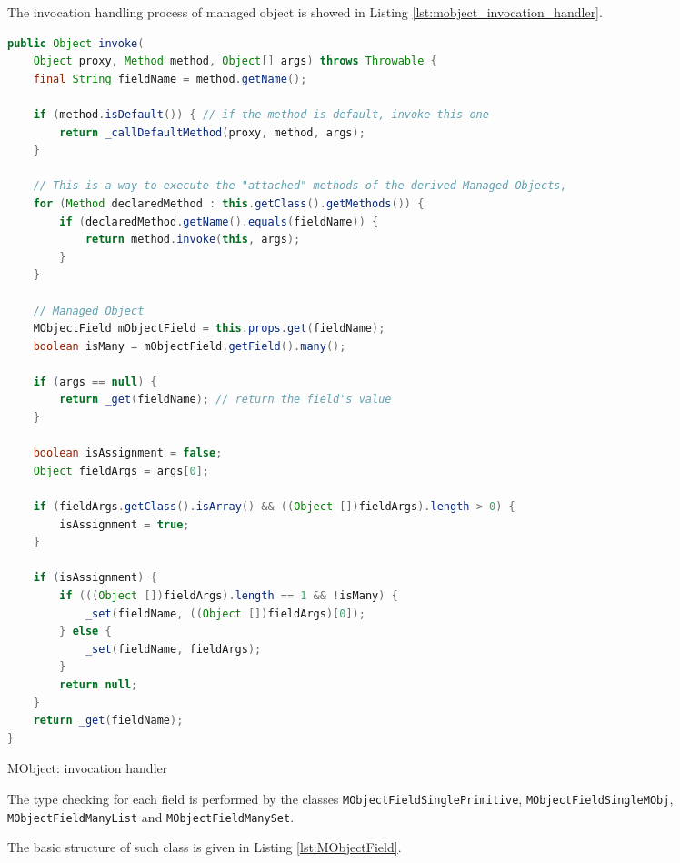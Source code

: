 The invocation handling process of managed object is showed in Listing \ref{lst:mobject_invocation_handler}.

\begin{sourcecode}
	\begin{lstlisting}[language=Java, escapechar=|]
public Object invoke(
	Object proxy, Method method, Object[] args) throws Throwable {
	final String fieldName = method.getName();

	if (method.isDefault()) { // if the method is default, invoke this one
		return _callDefaultMethod(proxy, method, args);
	}

	// This is a way to execute the "attached" methods of the derived Managed Objects,
	for (Method declaredMethod : this.getClass().getMethods()) {
		if (declaredMethod.getName().equals(fieldName)) {
			return method.invoke(this, args);
		}
	}

	// Managed Object
	MObjectField mObjectField = this.props.get(fieldName);
	boolean isMany = mObjectField.getField().many();

	if (args == null) {
		return _get(fieldName); // return the field's value
	}

	boolean isAssignment = false;
	Object fieldArgs = args[0];

	if (fieldArgs.getClass().isArray() && ((Object [])fieldArgs).length > 0) {
		isAssignment = true;
	}

	if (isAssignment) {
		if (((Object [])fieldArgs).length == 1 && !isMany) {
			_set(fieldName, ((Object [])fieldArgs)[0]);
		} else {
			_set(fieldName, fieldArgs);
		}
		return null;
	}
	return _get(fieldName);
}
	\end{lstlisting}
	\caption{MObject: invocation handler}
	\label{lst:mobject_invocation_handler}
\end{sourcecode}

The type checking for each field is performed by the classes \texttt{MObjectFieldSinglePrimitive}, \texttt{MObjectFieldSingleMObj}, \texttt{MObjectFieldManyList} and \texttt{MObjectFieldManySet}.

The basic structure of such class is given in Listing \ref{lst:MObjectField}.

